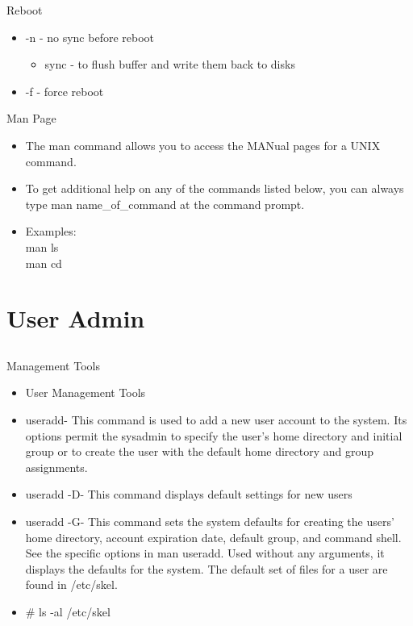 \documentclass{beamer}
\begin{document}
\begin{frame}{Reboot}
\begin{itemize}
\item -n - no sync before reboot
\begin{itemize}
\item sync - to flush buffer and write them back to disks
\end{itemize}
\item -f - force reboot
\end{itemize}
\end{frame}

\begin{frame}{Man Page}
\begin{itemize}
\item The man command allows you to access the MANual pages for a UNIX command.
\item To get additional help on any of the commands listed below, you can always type man name\_of\_command at the command prompt.
\item Examples:\\
man ls \\
man cd
\end{itemize}
\end{frame}

\section{User Admin}
\subsection{}
\begin{frame}{Management Tools}
\begin{itemize}
\item User Management Tools
\item useradd- This command is used to add a new user account to the system. Its options permit the sysadmin to specify the user's home directory and initial group or to create the user with the default home directory and group assignments.
\item useradd -D- This command displays default settings for new users
\item useradd -G- This command sets the system defaults for creating the users' home directory, account expiration date, default group, and command shell. See the specific options in man useradd. Used without any arguments, it displays the defaults for the system. The default set of files for a user are found in /etc/skel.
\item \# ls -al /etc/skel
\end{itemize}
\end{frame}
\end{document}
